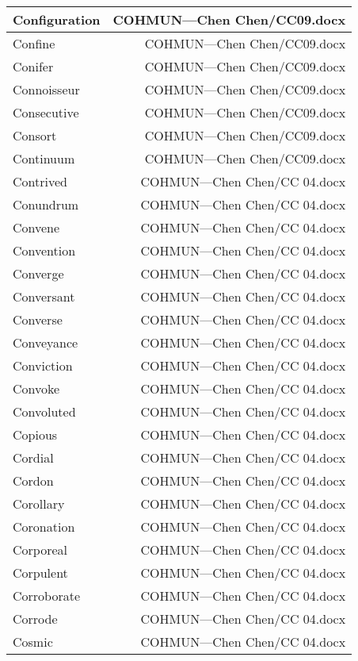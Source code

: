 \documentclass{article}
\begin{document}
\begin{center}
\begin{longtable}{|l|r|}
\hline
Configuration  &  COHMUN---Chen Chen/CC09.docx\\  
\hline
Confine  &  COHMUN---Chen Chen/CC09.docx\\  
\hline
Conifer  &  COHMUN---Chen Chen/CC09.docx\\  
\hline
Connoisseur  &  COHMUN---Chen Chen/CC09.docx\\  
\hline
Consecutive  &  COHMUN---Chen Chen/CC09.docx\\  
\hline
Consort  &  COHMUN---Chen Chen/CC09.docx\\  
\hline
Continuum  &  COHMUN---Chen Chen/CC09.docx\\  
\hline
Contrived  &  COHMUN---Chen Chen/CC 04.docx\\  
\hline
Conundrum  &  COHMUN---Chen Chen/CC 04.docx\\  
\hline
Convene  &  COHMUN---Chen Chen/CC 04.docx\\  
\hline
Convention  &  COHMUN---Chen Chen/CC 04.docx\\  
\hline
Converge  &  COHMUN---Chen Chen/CC 04.docx\\  
\hline
Conversant  &  COHMUN---Chen Chen/CC 04.docx\\  
\hline
Converse  &  COHMUN---Chen Chen/CC 04.docx\\  
\hline
Conveyance  &  COHMUN---Chen Chen/CC 04.docx\\  
\hline
Conviction  &  COHMUN---Chen Chen/CC 04.docx\\  
\hline
Convoke  &  COHMUN---Chen Chen/CC 04.docx\\  
\hline
Convoluted  &  COHMUN---Chen Chen/CC 04.docx\\  
\hline
Copious  &  COHMUN---Chen Chen/CC 04.docx\\  
\hline
Cordial  &  COHMUN---Chen Chen/CC 04.docx\\  
\hline
Cordon  &  COHMUN---Chen Chen/CC 04.docx\\  
\hline
Corollary  &  COHMUN---Chen Chen/CC 04.docx\\  
\hline
Coronation  &  COHMUN---Chen Chen/CC 04.docx\\  
\hline
Corporeal  &  COHMUN---Chen Chen/CC 04.docx\\  
\hline
Corpulent  &  COHMUN---Chen Chen/CC 04.docx\\  
\hline
Corroborate  &  COHMUN---Chen Chen/CC 04.docx\\  
\hline
Corrode  &  COHMUN---Chen Chen/CC 04.docx\\  
\hline
Cosmic  &  COHMUN---Chen Chen/CC 04.docx\\  

\end{longtable}
\end{center}
\end{document}
